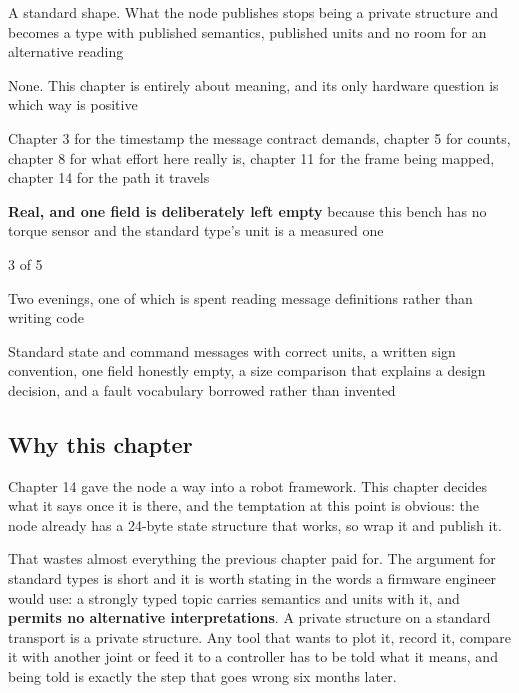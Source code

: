 
\begin{keyfacts}
\item[Adds to the node] A standard shape. What the node publishes stops being a
private structure and becomes a type with published semantics, published units
and no room for an alternative reading
\item[Peripherals] None. This chapter is entirely about meaning, and its only
hardware question is which way is positive
\item[Depends on] Chapter 3 for the timestamp the message contract demands,
chapter 5 for counts, chapter 8 for what effort here really is, chapter 11 for
the frame being mapped, chapter 14 for the path it travels
\item[Real or modelled] \textbf{Real, and one field is deliberately left empty}
because this bench has no torque sensor and the standard type's unit is a
measured one
\item[Difficulty] 3 of 5
\item[Effort] Two evenings, one of which is spent reading message definitions
rather than writing code
\item[Deliverable] Standard state and command messages with correct units, a
written sign convention, one field honestly empty, a size comparison that
explains a design decision, and a fault vocabulary borrowed rather than invented
\end{keyfacts}

\subsection*{Why this chapter}

Chapter 14 gave the node a way into a robot framework. This chapter decides what
it says once it is there, and the temptation at this point is obvious: the node
already has a 24-byte state structure that works, so wrap it and publish it.

That wastes almost everything the previous chapter paid for. The argument for
standard types is short and it is worth stating in the words a firmware engineer
would use: a strongly typed topic carries semantics and units with it, and
\textbf{permits no alternative interpretations}. A private structure on a
standard transport is a private structure. Any tool that wants to plot it, record
it, compare it with another joint or feed it to a controller has to be told what
it means, and being told is exactly the step that goes wrong six months later.

